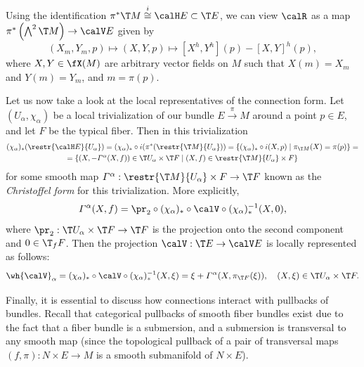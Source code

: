 \begin{cor}\label{cor curvature in terms of hor}
    Using the identification $\pi^\ast \T M\overset{i}{\cong}\calH E\subset \T E$, we can view $\calR$ as a map $\pi^\ast\left(\bigwedge^2\T M\right)\to \calV E$ given by 
    \[(X_m,Y_m,p)\mapsto (X,Y,p)\mapsto [X^h,Y^h](p)-[X,Y]^h(p),\]
    where $X,Y\in \fX(M)$ are arbitrary vector fields on $M$ such that $X(m)=X_m$ and $Y(m)=Y_m$, and $m=\pi(p)$.
\end{cor}

Let us now take a look at the local representatives of the connection form. Let $(U_\alpha,\chi_\alpha)$ be a local trivialization of our bundle $E\overset{\pi}{\to}M$ around a point $p\in E$, and let $F$ be the typical fiber. Then in this trivialization
\begin{multline}
    (\chi_\alpha)_\ast(\restr{\calH E}{U_\alpha})=(\chi_\alpha)_\ast\circ i(\pi^\ast (\restr{\T M}{U_\alpha}))=\{(\chi_\alpha)_\ast\circ i(X,p)\mid \pi_{\T M}(X)=\pi(p)\}=\\
    =\{(X,-\varGamma^\alpha(X,f))\in \T U_\alpha\times \T F\mid (X,f)\in \restr{\T M}{U_\alpha}\times F\}
\end{multline}
for some smooth map $\varGamma^\alpha:\restr{\T M}{U_\alpha}\times F\to \T F$ known as the \emph{Christoffel form} for this trivialization. More explicitly,
\[\varGamma^\alpha(X,f)=\pr_2\circ (\chi_\alpha)_\ast\circ \calV\circ (\chi_\alpha)_\ast^{-1}(X,0),\]
where $\pr_2:\T U_\alpha\times \T F\to \T F$ is the projection onto the second component and $0 \in \T_fF$. Then the projection $\calV:\T E\to \calV E$ is locally represented as follows:
\[\wh{\calV}_\alpha=(\chi_\alpha)_\ast\circ \calV\circ (\chi_\alpha)_\ast^{-1}(X,\xi)=\xi+\varGamma^\alpha(X,\pi_{\T F}(\xi)),\quad (X,\xi)\in \T U_\alpha\times \T F.\]

Finally, it is essential to discuss how connections interact with pullbacks of bundles. Recall that categorical pullbacks of smooth fiber bundles exist due to the fact that a fiber bundle is a submersion, and a submersion is transversal to any smooth map (since the topological pullback of a pair of transversal maps $(f,\pi):N\times E\to M$ is a smooth submanifold of $N\times E$).

